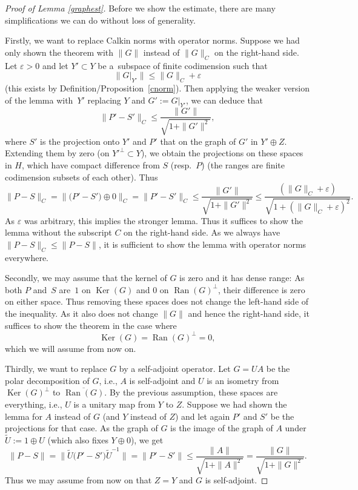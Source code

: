 \documentclass[pdftex]{sigma}
\numberwithin{equation}{section}
\DeclareMathOperator{\Ran}{Ran}
\DeclareMathOperator{\Ker}{Ker}
\begin{document}
	\begin{proof}[Proof of Lemma \ref{graphest}]
		Before we show the estimate, there are many simplifications we can do without loss of generality.

		Firstly, we want to replace Calkin norms with operator norms. Suppose we had only shown the theorem with $\|G\|$ instead of $\|G\|_C$ on the right-hand side. Let $\varepsilon >0$ and let $Y'\subset Y$ be a~subspace of finite codimension such that
		\[\|G|_{Y'}\|\leq\|G\|_C+\varepsilon\]
		(this exists by Definition/Proposition~\ref{cnorm}). Then applying the weaker version of the lemma with~$Y'$ replacing $Y$ and $G':=G|_{Y'}$, we can deduce that
		\[\bigl\|P'-S'\bigr\|_C\leq \frac{\|G'\|}{\sqrt{1+\|G'\|^2}},\]
		where $S'$ is the projection onto $Y'$ and $P'$ that on the graph of $G'$ in $Y'\oplus Z$. Extending them by zero \big(on $Y'^\bot\subset Y$\big), we obtain the projections on these spaces in $H$, which have compact difference from $S$ (resp.\ $P$) (the ranges are finite codimension subsets of each other).
		Thus
		\[\|P-S\|_C=\bigl\|\bigl(P'-S'\bigr)\oplus 0\bigr\|_C=\bigl\|P'-S'\bigr\|_C\leq \frac{\|G'\|}{\sqrt{1+\|G'\|^2}}\leq \frac{(\|G\|_C+\varepsilon)}{\sqrt{1+(\|G\|_C+\varepsilon)^2}}.\]
		As $\varepsilon$ was arbitrary, this implies the stronger lemma. Thus it suffices to show the lemma without the subscript $C$ on the right-hand side. As we always have $\|P-S\|_C\leq \|P-S\|$, it is sufficient to show the lemma with operator norms everywhere.
		
		Secondly, we may assume that the kernel of $G$ is zero and it has dense range: As both $P$ and~$S$ are~$1$ on $\Ker(G)$ and $0$ on $\Ran(G)^\bot$, their difference is zero on either space. Thus removing these spaces does not change the left-hand side of the inequality. As it also does not change $\|G\|$ and hence the right-hand side, it suffices to show the theorem in the case where
\[
\Ker(G)=\Ran(G)^\bot=0,
\]
		which we will assume from now on.

		Thirdly, we want to replace $G$ by a self-adjoint operator. Let $G=UA$ be the polar decomposition of $G$, i.e., $A$ is self-adjoint and $U$ is an isometry from $\Ker(G)^\bot$ to $\overline{\Ran(G)}$. By the previous assumption, these spaces are everything, i.e., $U$ is a unitary map from $Y$ to $Z$. Suppose we had shown the lemma for $A$ instead of $G$ (and $Y$ instead of $Z$) and let again $P'$ and $S'$ be the projections for that case. As the graph of $G$ is the image of the graph of $A$ under $\tilde U:=1\oplus U$ (which also fixes $Y\oplus 0$), we get
		\[
        \|P-S\|=\bigl\|\tilde U\bigl(P'-S'\bigr)\tilde U^{-1}\bigr\|=\bigl\|P'-S'\bigr\|\leq \frac{\|A\|}{\sqrt{1+\|A\|^2}}=\frac{\|G\|}{\sqrt{1+\|G\|^2}}.
        \]
		Thus we may assume from now on that $Z=Y$ and $G$ is self-adjoint.


\end{proof}
\end{document}
